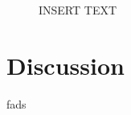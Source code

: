 \documentclass[a4paper,oneside,article,11pt]{memoir}
\begin{document}
\begin{figure}[H]
\begin{minipage}{0.48\columnwidth}
  \caption{INSERT TEXT}
  \label{fig:delmin_2_worst_branch}
\end{minipage}
\end{figure}

\section{Discussion}
fads


\end{document}
